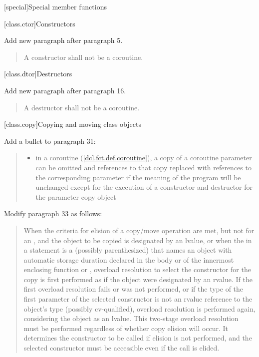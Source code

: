 
\setcounter{chapter}{11}
[special]{Special member functions}

\setcounter{section}{0}
[class.ctor]{Constructors}%

Add new paragraph after paragraph 5.

	\setcounter{Paras}{5}
\begin{quote}
	\pnum A constructor shall not be a coroutine.
\end{quote}

\setcounter{section}{3}
[class.dtor]{Destructors}%

Add new paragraph after paragraph 16.

	\setcounter{Paras}{16}
\begin{quote}
	\pnum A destructor shall not be a coroutine.
\end{quote}

\setcounter{section}{7}
[class.copy]{Copying and moving class objects}%

Add a bullet to paragraph 31:

\begin{quote}
\begin{itemize}
	\item in a coroutine (\ref{dcl.fct.def.coroutine}), a copy of a coroutine parameter  can be omitted
	and references to that copy replaced with references to the corresponding parameter if the meaning of the program will
	be unchanged except for the execution of a constructor and destructor for the parameter copy object
\end{itemize}
\end{quote} 

Modify paragraph 33 as follows:

\begin{quote}
\setcounter{Paras}{32}
\pnum
When the criteria for elision of a copy/move operation are met,
but not for an ,
and the object
to be copied is designated by an lvalue,
or when the  in a    statement
is a (possibly parenthesized) 
that names an object with automatic storage duration declared in the body
or  of the innermost enclosing
function or ,
overload resolution to select the constructor
for the copy  is first performed as if the object were designated by an rvalue.
If the first overload resolution fails or was not performed,
or if the type of the first parameter of the selected
constructor is not an rvalue reference to the object's type (possibly cv-qualified),
overload resolution is performed again, considering the object as an lvalue.
\enternote This two-stage overload resolution must be performed regardless
of whether copy elision will occur. It determines the constructor to be called if
elision is not performed, and the selected constructor must be accessible even if
the call is elided. \exitnote
\end{quote}